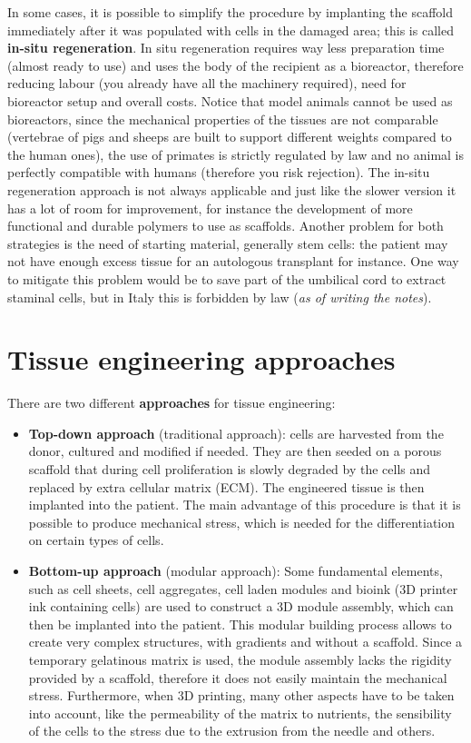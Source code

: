   In some cases, it is possible to simplify the procedure by implanting the scaffold immediately after it was populated with cells in the damaged area; this is called \textbf{in-situ regeneration}. In situ regeneration requires way less preparation time (almost ready to use) and uses the body of the recipient as a bioreactor, therefore reducing labour (you already have all the machinery required), need for bioreactor setup and overall costs. Notice that model animals cannot be used as bioreactors, since the mechanical properties of the tissues are not comparable (vertebrae of pigs and sheeps are built to support different weights compared to the human ones), the use of primates is strictly regulated by law and no animal is perfectly compatible with humans (therefore you risk rejection). The in-situ regeneration approach is not always applicable and just like the slower version it has a lot of room for improvement, for instance the development of more functional and durable polymers to use as scaffolds. Another problem for both strategies is the need of starting material, generally stem cells: the patient may not have enough excess tissue for an autologous transplant for instance. One way to mitigate this problem would be to save part of the umbilical cord to extract staminal cells, but in Italy this is forbidden by law (\textit{as of writing the notes}).

\section{Tissue engineering approaches}
  There are two different \textbf{approaches} for tissue engineering:
  \begin{itemize}
    \item \textbf{Top-down approach} (traditional approach): cells are harvested from the donor, cultured and modified if needed. They are then seeded on a porous scaffold that during cell proliferation is slowly degraded by the cells and replaced by extra cellular matrix (ECM). The engineered tissue is then implanted into the patient. The main advantage of this procedure is that it is possible to produce mechanical stress, which is needed for the differentiation on certain types of cells.
    \item \textbf{Bottom-up approach} (modular approach): Some fundamental elements, such as cell sheets, cell aggregates, cell laden modules and bioink (3D printer ink containing cells) are used to construct a 3D module assembly, which can then be implanted into the patient. This modular building process allows to create very complex structures, with gradients and without a scaffold. Since a temporary gelatinous matrix is used, the module assembly lacks the rigidity provided by a scaffold, therefore it does not easily maintain the mechanical stress. Furthermore, when 3D printing, many other aspects have to be taken into account, like the permeability of the matrix to nutrients, the sensibility of the cells to the stress due to the extrusion from the needle and others.
  \end{itemize}

